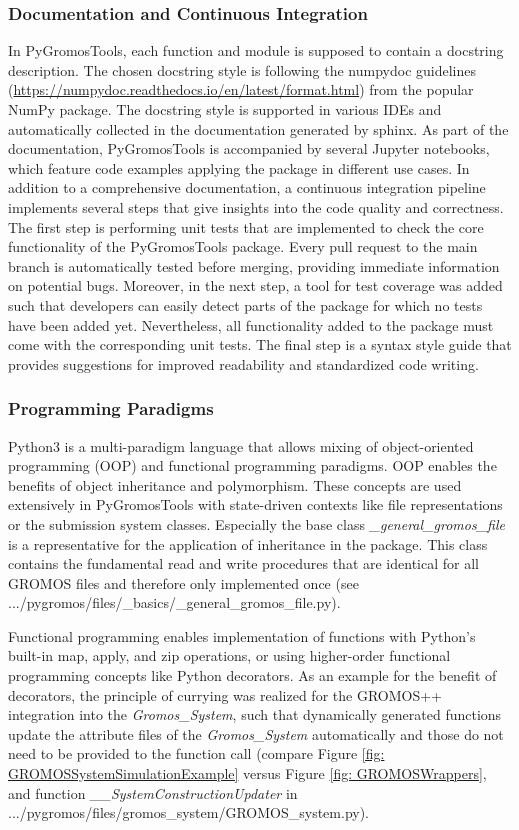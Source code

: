 \subsubsection{Documentation and Continuous Integration}
In PyGromosTools, each function and module is supposed to contain a docstring description. The chosen docstring style is following the numpydoc guidelines (\url{https://numpydoc.readthedocs.io/en/latest/format.html}) from the popular NumPy package.\cite{Vanderwalt2011} The docstring style is supported in various IDEs and automatically collected in the documentation generated by sphinx\cite{brandl2021}. As part of the documentation, PyGromosTools is accompanied by several Jupyter notebooks, which feature code examples applying the package in different use cases.\cite{Kluyver2016}
In addition to a comprehensive documentation, a continuous integration pipeline implements several steps that give insights into the code quality and correctness. The first step is performing unit tests that are implemented to check the core functionality of the PyGromosTools package. Every pull request to the main branch is automatically tested before merging, providing immediate information on potential bugs. Moreover, in the next step, a tool for test coverage was added such that developers can easily detect parts of the package for which no tests have been added yet. Nevertheless, all functionality added to the package must come with the corresponding unit tests. The final step is a syntax style guide that provides suggestions for improved readability and standardized code writing.

\subsubsection{Programming Paradigms}
Python3 is a multi-paradigm language that allows mixing of object-oriented programming (OOP)\cite{Kay1993} and functional programming paradigms. 
OOP enables the benefits of object inheritance and polymorphism.\cite{Ganney2020} These concepts are used extensively in PyGromosTools with state-driven contexts like file representations or the submission system classes. Especially the base class \textit{\_general\_gromos\_file} is a representative for the application of inheritance in the package. This class contains the fundamental read and write procedures that are identical for all GROMOS files and therefore only implemented once (see .../pygromos/files/\_basics/\_general\_gromos\_file.py).

Functional programming enables implementation of functions with Python's built-in map, apply, and zip operations, or using higher-order functional programming concepts like Python decorators.\cite{Ganney2020} As an example for the benefit of decorators, the principle of currying\cite{Curry1958} was realized for the GROMOS++ integration into the \textit{Gromos\_System}, such that dynamically generated functions update the attribute files of the \textit{Gromos\_System} automatically and those do not need to be provided to the function call (compare Figure \ref{fig: GROMOSSystemSimulationExample} versus Figure \ref{fig: GROMOSWrappers}, and function \textit{\_\_SystemConstructionUpdater} in .../pygromos/files/gromos\_system/GROMOS\_system.py).

